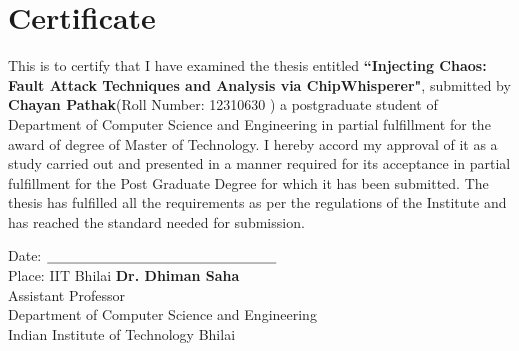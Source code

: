 \chapter{Certificate}

\begin{Spacing}{1.5}
\sffamily
This is to certify that I have examined the thesis entitled \textbf{``Injecting Chaos: Fault Attack Techniques and Analysis via ChipWhisperer"}, submitted by \textbf{Chayan Pathak}(Roll Number: 12310630 ) a postgraduate student of Department of Computer Science and Engineering in partial fulfillment for the award of degree of Master of Technology. I hereby accord my approval of it as a study carried out and presented in a manner required for its acceptance in partial fulfillment for the Post Graduate Degree for which it has been
submitted. The thesis has fulfilled all the requirements as per the regulations of the Institute and has reached the standard needed for submission.

\end{Spacing}




\vspace{2cm}



\noindent
Date: \hspace{0pt plus 1filll} $\underline{\hspace{5.8cm}}$\\
Place: IIT Bhilai \hspace{0pt plus 1filll} \textbf{Dr. Dhiman Saha}\\
\hspace*{0pt plus 1filll} Assistant Professor\\
\hspace*{0pt plus 1filll} Department of Computer Science and Engineering\\
\hspace*{0pt plus 1filll} Indian Institute of Technology Bhilai


